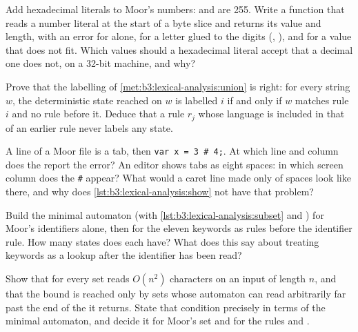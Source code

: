 \begin{exercise}[$\star\star$]\label{exo:b3:lexical-analysis:6}
Add hexadecimal literals to Moor's numbers:  and  are 255. Write a function that reads a number literal at the start of a byte slice and returns its value and length, with an error for  alone, for a letter glued to the digits (, ), and for a value that does not fit. Which values should a hexadecimal literal accept that a decimal one does not, on a 32-bit machine, and why?
\end{exercise}

\begin{exercise}[$\star\star$]\label{exo:b3:lexical-analysis:7}
Prove that the labelling of \cref{met:b3:lexical-analysis:union} is right: for every string $w$, the deterministic state reached on $w$ is labelled $i$ if and only if $w$ matches rule $i$ and no rule before it. Deduce that a rule $r_j$ whose language is included in that of an earlier rule never labels any state.
\end{exercise}

\begin{exercise}[$\star\star$]\label{exo:b3:lexical-analysis:8}
A line of a Moor file is a tab, then \texttt{var x = 3 \# 4;}. At which line and column does the  report the error? An editor shows tabs as eight spaces: in which screen column does the \texttt{\#} appear? What would a caret line made only of spaces look like there, and why does \cref{lst:b3:lexical-analysis:show} not have that problem?
\end{exercise}

\begin{exercise}[$\star\star$]\label{exo:b3:lexical-analysis:9}
Build the minimal  automaton (with \cref{lst:b3:lexical-analysis:subset} and ) for Moor's identifiers alone, then for the eleven keywords as rules before the identifier rule. How many states does each have? What does this say about treating keywords as a lookup after the identifier has been read?
\end{exercise}

\begin{exercise}[$\star\star\star$]\label{exo:b3:lexical-analysis:10}
Show that for every  set  reads $O(n^2)$ characters on an input of length $n$, and that the bound is reached only by  sets whose automaton can read arbitrarily far past the end of the  it returns. State that condition precisely in terms of the minimal automaton, and decide it for Moor's  set and for the rules \code{-} and \code{-+>}.
\end{exercise}

